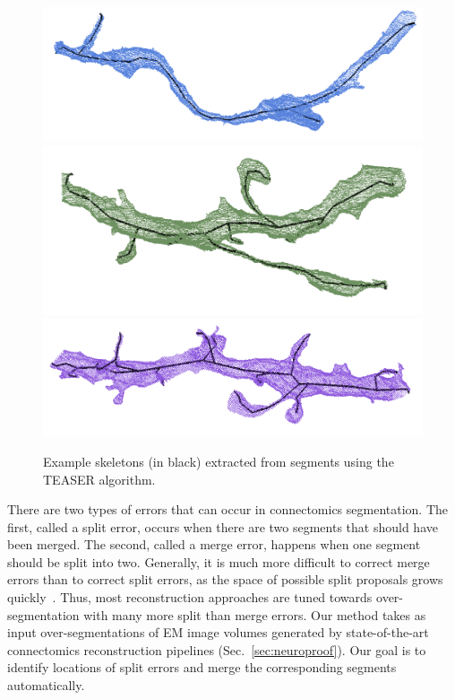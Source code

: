 \begin{figure}[t]
	\centering
	\includegraphics[width=0.82\linewidth]{./figures/skeleton1.png}
	\includegraphics[width=0.82\linewidth]{./figures/skeleton2.png}
	\includegraphics[width=0.82\linewidth]{./figures/skeleton3.png}
	\caption{Example skeletons (in black) extracted from segments using the TEASER algorithm.}
	\label{fig:skeletonization}
\end{figure}

There are two types of errors that can occur in connectomics segmentation.
The first, called a split error, occurs when there are two segments that should have been merged. The second, called a merge error, happens when one segment should be split into two. Generally, it is much more difficult to correct merge errors than to correct split errors,
as the space of possible split proposals grows quickly~\cite{parag2015properties}.
Thus, most reconstruction approaches are tuned towards over-segmentation with many more split than merge errors. Our method takes as input over-segmentations of EM image volumes generated by state-of-the-art connectomics reconstruction pipelines (Sec.~\ref{sec:neuroproof}). Our goal is to identify locations of split errors and merge the corresponding segments automatically.

